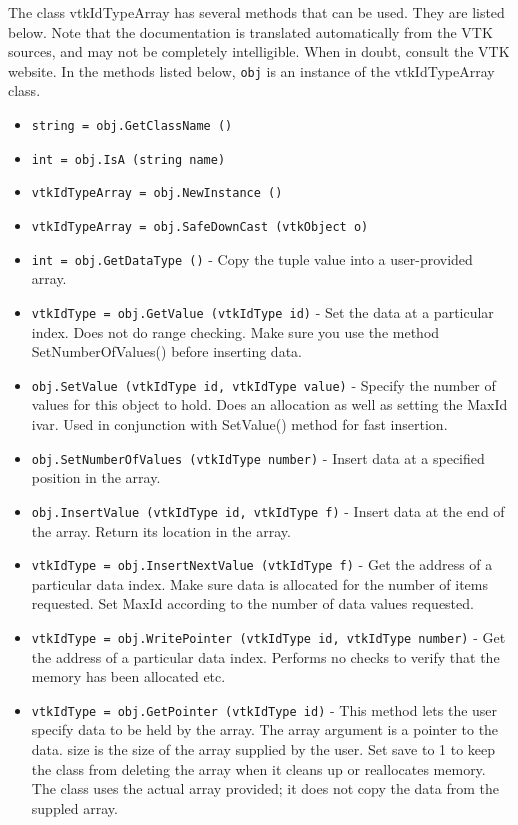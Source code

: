 The class vtkIdTypeArray has several methods that can be used.
  They are listed below.
Note that the documentation is translated automatically from the VTK sources,
and may not be completely intelligible.  When in doubt, consult the VTK website.
In the methods listed below, \verb|obj| is an instance of the vtkIdTypeArray class.
\begin{itemize}
\item  \verb|string = obj.GetClassName ()|

\item  \verb|int = obj.IsA (string name)|

\item  \verb|vtkIdTypeArray = obj.NewInstance ()|

\item  \verb|vtkIdTypeArray = obj.SafeDownCast (vtkObject o)|

\item  \verb|int = obj.GetDataType ()| -  Copy the tuple value into a user-provided array.

\item  \verb|vtkIdType = obj.GetValue (vtkIdType id)| -  Set the data at a particular index. Does not do range checking. Make sure
 you use the method SetNumberOfValues() before inserting data.

\item  \verb|obj.SetValue (vtkIdType id, vtkIdType value)| -  Specify the number of values for this object to hold. Does an
 allocation as well as setting the MaxId ivar. Used in conjunction with
 SetValue() method for fast insertion.

\item  \verb|obj.SetNumberOfValues (vtkIdType number)| -  Insert data at a specified position in the array.

\item  \verb|obj.InsertValue (vtkIdType id, vtkIdType f)| -  Insert data at the end of the array. Return its location in the array.

\item  \verb|vtkIdType = obj.InsertNextValue (vtkIdType f)| -  Get the address of a particular data index. Make sure data is allocated
 for the number of items requested. Set MaxId according to the number of
 data values requested.

\item  \verb|vtkIdType = obj.WritePointer (vtkIdType id, vtkIdType number)| -  Get the address of a particular data index. Performs no checks
 to verify that the memory has been allocated etc.

\item  \verb|vtkIdType = obj.GetPointer (vtkIdType id)| -  This method lets the user specify data to be held by the array.  The
 array argument is a pointer to the data.  size is the size of
 the array supplied by the user.  Set save to 1 to keep the class
 from deleting the array when it cleans up or reallocates memory.
 The class uses the actual array provided; it does not copy the data
 from the suppled array. 

\end{itemize}
